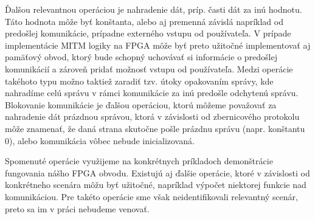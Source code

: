 Ďalšou relevantnou operáciou je nahradenie dát, príp. časti dát za inú hodnotu. Táto hodnota môže byť konštanta, alebo aj premenná závislá napríklad od predošlej komunikácie, prípadne externého vstupu od používateľa. V prípade implementácie MITM logiky na FPGA môže byť preto užitočné implementovať aj pamäťový obvod, ktorý bude schopný uchovávať si informácie o predošlej komunikácií a zároveň pridať možnosť vstupu od používateľa. Medzi operácie takéhoto typu možno taktiež zaradiť tzv. útoky opakovaním správy, kde nahradíme celú správu v rámci komunikácie za inú predošle odchytenú správu. Blokovanie komunikácie je ďalšou operáciou, ktorú môžeme považovať za nahradenie dát prázdnou správou, ktorá v závislosti od zbernicového protokolu môže znamenať, že daná strana skutočne pošle prázdnu správu (napr. konštantu 0), alebo komunikácia vôbec nebude inicializovaná.

Spomenuté operácie využijeme na konkrétnych príkladoch demonštrácie fungovania nášho FPGA obvodu. Existujú aj ďalšie operácie, ktoré v závislosti od konkrétneho scenára môžu byť užitočné, napríklad výpočet niektorej funkcie nad komunikáciou. Pre takéto operácie sme však neidentifikovali relevantný scenár, preto sa im v práci nebudeme venovať.